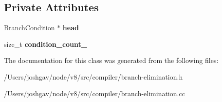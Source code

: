 \subsection*{Private Attributes}
\begin{DoxyCompactItemize}
\item 
\hyperlink{structv8_1_1internal_1_1compiler_1_1_branch_elimination_1_1_branch_condition}{Branch\+Condition} $\ast$ {\bfseries head\+\_\+}\hypertarget{classv8_1_1internal_1_1compiler_1_1_branch_elimination_1_1_control_path_conditions_a6dc91d6cb637135167d40a34272cc21d}{}\label{classv8_1_1internal_1_1compiler_1_1_branch_elimination_1_1_control_path_conditions_a6dc91d6cb637135167d40a34272cc21d}

\item 
size\+\_\+t {\bfseries condition\+\_\+count\+\_\+}\hypertarget{classv8_1_1internal_1_1compiler_1_1_branch_elimination_1_1_control_path_conditions_a04f697d27c293167b5dbc9834d39c444}{}\label{classv8_1_1internal_1_1compiler_1_1_branch_elimination_1_1_control_path_conditions_a04f697d27c293167b5dbc9834d39c444}

\end{DoxyCompactItemize}


The documentation for this class was generated from the following files\+:\begin{DoxyCompactItemize}
\item 
/\+Users/joshgav/node/v8/src/compiler/branch-\/elimination.\+h\item 
/\+Users/joshgav/node/v8/src/compiler/branch-\/elimination.\+cc\end{DoxyCompactItemize}
